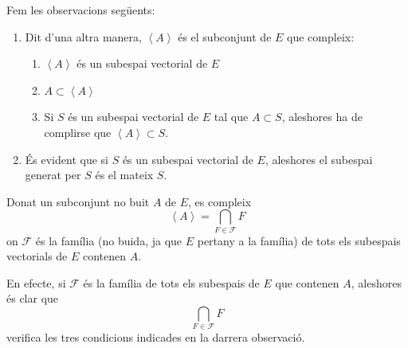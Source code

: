 \begin{observacio}
Fem les observacions següents:

\begin{enumerate}
\item Dit d'una altra manera, $\left\langle A\right\rangle $ és el subconjunt
de $E$ que compleix:

\begin{enumerate}
\item $\left\langle A\right\rangle $ és un subespai vectorial de $E$

\item $A\subset \left\langle A\right\rangle $

\item Si $S$ és un subespai vectorial de $E$ tal que $%
A\subset S$, aleshores ha de complirse que $\left\langle
A\right\rangle \subset S$.
\end{enumerate}

\item És evident que si $S$ és un subespai vectorial de $E$, aleshores el subespai generat per $S$ és el mateix $S$.
\end{enumerate}
\end{observacio}

\begin{teorema}
Donat un subconjunt no buit $A$ de $E$, es compleix%
\begin{equation*}
\left\langle A\right\rangle =\bigcap_{F\in \mathcal{F}}F
\end{equation*}%
on $\mathcal{F}$ és la família (no buida, ja que $E$
pertany a la família) de tots els subespais vectorials de $E$
contenen $A$.

\end{teorema}
\begin{prova}
En efecte, si $\mathcal{F}$ és la família de tots els subespais de $%
E$ que contenen $A$, aleshores és clar que 
\begin{equation*}
\bigcap_{F\in \mathcal{F}}F
\end{equation*}%
verifica les tres condicions indicades en la darrera observació.
\end{prova}

